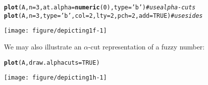 \documentclass[11pt]{article}\usepackage[]{graphicx}\usepackage[]{color}
\makeatletter
\newcommand{\hlnum}[1]{\textcolor[rgb]{0.686,0.059,0.569}{#1}}%
\newcommand{\hlstr}[1]{\textcolor[rgb]{0.192,0.494,0.8}{#1}}%
\newcommand{\hlcom}[1]{\textcolor[rgb]{0.678,0.584,0.686}{\textit{#1}}}%
\newcommand{\hlstd}[1]{\textcolor[rgb]{0.345,0.345,0.345}{#1}}%
\newcommand{\hlkwc}[1]{\textcolor[rgb]{0.333,0.667,0.333}{#1}}%
\newcommand{\hlkwd}[1]{\textcolor[rgb]{0.737,0.353,0.396}{\textbf{#1}}}%
\newenvironment{kframe}{%
 \def\at@end@of@kframe{}%
 \ifinner\ifhmode%
  \def\at@end@of@kframe{\end{minipage}}%
  \begin{minipage}{\columnwidth}%
 \fi\fi%
 \def\FrameCommand##1{\hskip\@totalleftmargin \hskip-\fboxsep
 \colorbox{shadecolor}{##1}\hskip-\fboxsep
     \hskip-\linewidth \hskip-\@totalleftmargin \hskip\columnwidth}%
 \MakeFramed {\advance\hsize-\width
   \@totalleftmargin\z@ \linewidth\hsize
   \@setminipage}}%
 {\par\unskip\endMakeFramed%
 \at@end@of@kframe}
\newenvironment{knitrout}{}{} %
\makeatother
\begin{document}
\begin{knitrout}\small
{}\color{fgcolor}\begin{kframe}
\begin{alltt}
\hlkwd{plot}\hlstd{(A,} \hlkwc{n}\hlstd{=}\hlnum{3}\hlstd{,} \hlkwc{at.alpha}\hlstd{=}\hlkwd{numeric}\hlstd{(}\hlnum{0}\hlstd{),} \hlkwc{type}\hlstd{=}\hlstr{'b'}\hlstd{)} \hlcom{# use alpha-cuts}
\hlkwd{plot}\hlstd{(A,} \hlkwc{n}\hlstd{=}\hlnum{3}\hlstd{,} \hlkwc{type}\hlstd{=}\hlstr{'b'}\hlstd{,} \hlkwc{col}\hlstd{=}\hlnum{2}\hlstd{,} \hlkwc{lty}\hlstd{=}\hlnum{2}\hlstd{,} \hlkwc{pch}\hlstd{=}\hlnum{2}\hlstd{,} \hlkwc{add}\hlstd{=}\hlnum{TRUE}\hlstd{)} \hlcom{# use sides}
\end{alltt}
\end{kframe}
\end{knitrout}

\begin{center}
\begin{knitrout}\small
{}\color{fgcolor}

{\centering \texttt{[image: figure/depicting1f-1]} 

}



\end{knitrout}
\end{center}

\bigskip
We may also illustrate an $\alpha$-cut representation of a fuzzy number:

\begin{knitrout}\small
{}\color{fgcolor}\begin{kframe}
\begin{alltt}
\hlkwd{plot}\hlstd{(A,} \hlkwc{draw.alphacuts}\hlstd{=}\hlnum{TRUE}\hlstd{)}
\end{alltt}
\end{kframe}
\end{knitrout}

\begin{center}
\begin{knitrout}\small
{}\color{fgcolor}

{\centering \texttt{[image: figure/depicting1h-1]} 

}



\end{knitrout}
\end{center}
\end{document}
